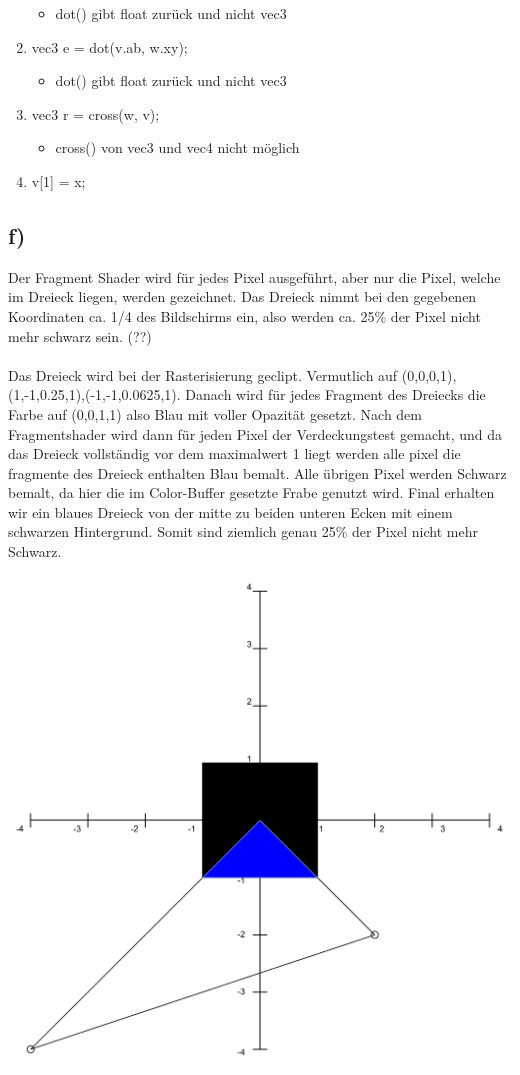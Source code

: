 \documentclass{article}
\begin{document}
\begin{enumerate}
\begin{itemize}
              \item dot() gibt float zurück und nicht vec3
          \end{itemize}
    \item vec3 e = dot(v.ab, w.xy);
          \begin{itemize}
              \item dot() gibt float zurück und nicht vec3
          \end{itemize}
    \item vec3 r = cross(w, v);
          \begin{itemize}
              \item cross() von vec3 und vec4 nicht möglich
          \end{itemize}
    \item v[1] = x;
\end{enumerate}

\subsection*{f)}
Der Fragment Shader wird für jedes Pixel ausgeführt, aber nur die Pixel, welche im Dreieck liegen, werden gezeichnet.
Das Dreieck nimmt bei den gegebenen Koordinaten ca. 1/4 des Bildschirms ein, also werden ca. 25\% der Pixel nicht mehr schwarz sein. (??)\\~\\

Das Dreieck wird bei der Rasterisierung geclipt. Vermutlich auf (0,0,0,1),(1,-1,0.25,1),(-1,-1,0.0625,1). Danach wird für jedes Fragment des Dreiecks die Farbe auf (0,0,1,1) also Blau mit voller Opazität gesetzt. Nach dem Fragmentshader wird dann für jeden Pixel der Verdeckungstest gemacht, und da das Dreieck vollständig vor dem maximalwert 1 liegt werden alle pixel die fragmente des Dreieck enthalten Blau bemalt. Alle übrigen Pixel werden Schwarz bemalt, da hier die im Color-Buffer gesetzte Frabe genutzt wird. Final erhalten wir ein blaues Dreieck von der mitte zu beiden unteren Ecken mit einem schwarzen Hintergrund. Somit sind ziemlich genau 25\%  der Pixel nicht mehr Schwarz.

\includegraphics[width=\textwidth, keepaspectratio]{CG6.1.f.drawio.pdf}
\end{document}
